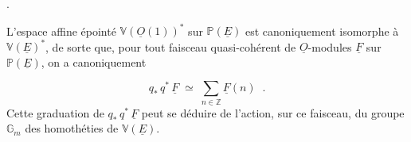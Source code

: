 \begin{center}
\quad .
\end{center}
L'espace affine \'epoint\'e $\mathbb{V}(\underline{O}(1))^*$ sur $\mathbb{P}(\underline{E})$ est canoniquement isomorphe \`a $\mathbb{V}(\underline{E})^*$, de sorte que, pour tout faisceau quasi-coh\'erent de $\underline{O}$-modules $\underline{F}$ sur $\mathbb{P}(\underline{E})$, on a canoniquement 



\begin{equation}\tag{1.1.1}
q_* \, q^* \, \underline{F} \;\simeq\; \sum_{n \in \mathbb{Z}} \underline{F}(n) \;\; .
\end{equation}
Cette graduation de $q_* \, q^* \, \underline{F}$ peut se déduire de l'action, sur ce faisceau, du groupe $\mathbb{G}_m$ des homothéties de $\mathbb{V}(\underline{E})$.

